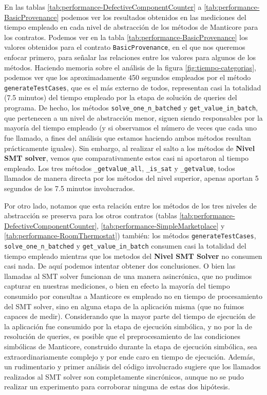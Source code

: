 En las tablas \ref{tab:performance-DefectiveComponentCounter} a \ref{tab:performance-BasicProvenance} podemos ver los resultados obtenidos en las mediciones del tiempo empleado en cada nivel de abstracción de los métodos de Manticore para los contratos.
Podemos ver en la tabla \ref{tab:performance-BasicProvenance} los valores obtenidos para el contrato \texttt{BasicProvenance},
en el que nos queremos enfocar primero, para señalar las relaciones entre los valores para algunos de los métodos.
Haciendo memoria sobre el análisis de la figura \ref{fig:tiempo-categorias}, podemos ver que los aproximadamente 450 segundos empleados por el método \texttt{generateTestCases}, que es el más externo de todos, representan casi la totalidad (7.5 minutos) del tiempo empleado por la etapa de solución de queries del programa.
De hecho, los métodos \texttt{solve\_one\_n\_batched} y \texttt{get\_value\_in\_batch}, que pertenecen a un nivel de abstracción menor, siguen siendo responsables por la mayoría del tiempo empleado (y si observamos el número de veces que cada uno fue llamado, a fines del análisis que estamos haciendo ambos métodos resultan prácticamente iguales).
Sin embargo, al realizar el salto a los métodos de \textbf{Nivel SMT solver}, vemos que comparativamente estos casi ni aportaron al tiempo empleado.
Los tres métodos \texttt{\_getvalue\_all}, \texttt{\_is\_sat} y \texttt{\_getvalue}, todos llamados de manera directa por los métodos del nivel superior, apenas aportan 5 segundos de los 7.5 minutos involucrados.

Por otro lado, notamos que esta relación entre los métodos de los tres niveles de abstracción se preserva para los otros contratos (tablas \ref{tab:performance-DefectiveComponentCounter}, \ref{tab:performance-SimpleMarketplace} y \ref{tab:performance-RoomThermostat}) también: los métodos \texttt{generateTestCases}, \texttt{solve\_one\_n\_batched} y \texttt{get\_value\_in\_batch} consumen casi la totalidad del tiempo empleado mientras que los metodos del \textbf{Nivel SMT Solver} no consumen casi nada.
De aquí podemos intentar obtener dos conclusiones.
O bien las llamadas al SMT solver funcionan de una manera asincrónica, que no pudimos capturar en nuestras mediciones, o bien en efecto la mayoría del tiempo consumido por consultas a Manticore es empleado no en tiempo de procesamiento del SMT solver, sino en alguna etapa de la aplicación misma (que no fuimos capaces de medir).
Considerando que la mayor parte del tiempo de ejecución de la aplicación fue consumido por la etapa de ejecución simbólica, y no por la de resolución de queries, es posible que el preprocesamiento de las condiciones simbólicas de Manticore, construido durante la etapa de ejecución simbólica, sea extraordinariamente complejo y por ende caro en tiempo de ejecución.
Además, un rudimentario y primer análisis del código involucrado sugiere que los llamados realizados al SMT solver son completamente sincrónicos, aunque no se pudo realizar un experimento para corroborar ninguna de estas dos hipótesis.



